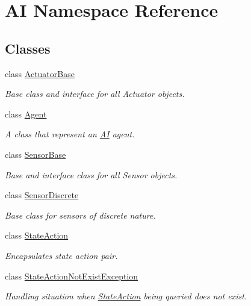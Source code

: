 \hypertarget{namespaceAI}{\section{A\-I Namespace Reference}
\label{namespaceAI}
}
\subsection*{Classes}
\begin{DoxyCompactItemize}
\item 
class \hyperlink{classAI_1_1ActuatorBase}{Actuator\-Base}
\begin{DoxyCompactList}\small\item\em Base class and interface for all Actuator objects. \end{DoxyCompactList}\item 
class \hyperlink{classAI_1_1Agent}{Agent}
\begin{DoxyCompactList}\small\item\em A class that represent an \hyperlink{namespaceAI}{A\-I} agent. \end{DoxyCompactList}\item 
class \hyperlink{classAI_1_1SensorBase}{Sensor\-Base}
\begin{DoxyCompactList}\small\item\em Base and interface class for all Sensor objects. \end{DoxyCompactList}\item 
class \hyperlink{classAI_1_1SensorDiscrete}{Sensor\-Discrete}
\begin{DoxyCompactList}\small\item\em Base class for sensors of discrete nature. \end{DoxyCompactList}\item 
class \hyperlink{classAI_1_1StateAction}{State\-Action}
\begin{DoxyCompactList}\small\item\em Encapsulates state action pair. \end{DoxyCompactList}\item 
class \hyperlink{classAI_1_1StateActionNotExistException}{State\-Action\-Not\-Exist\-Exception}
\begin{DoxyCompactList}\small\item\em Handling situation when \hyperlink{classAI_1_1StateAction}{State\-Action} being queried does not exist. \end{DoxyCompactList}\item 

\end{DoxyCompactItemize}
